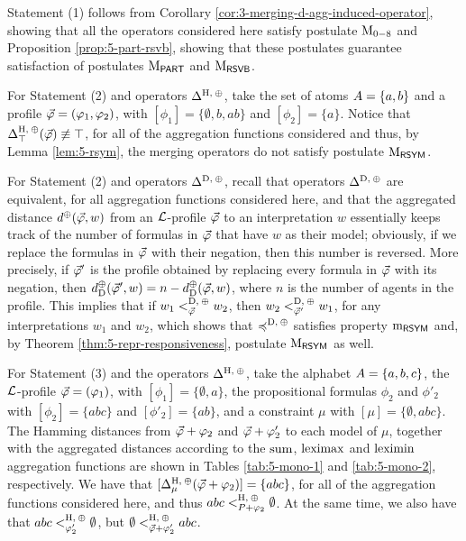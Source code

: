 \begin{prf*}{}{}%
	Statement (1) follows from Corollary \ref{cor:3-merging-d-agg-induced-operator},
	showing that all the operators considered here satisfy postulate $\ppm{0-8}$
	and Proposition \ref{prop:5-part-rsvb}, showing that these postulates guarantee 
	satisfaction of postulates $\ppm{\PART}$ and $\ppm{\RSVB}$.

	For Statement (2) and operators $\me^{\hamming,\:\agg}$,
	take the set of atoms $\Atoms=\{a,b\}$ and a profile $\P=(\phi_1,\phi_2)$,
	with $[\phi_{1}]=\{\emptyset,b,ab\}$ and $[\phi_{2}]=\{a\}$.
	Notice that $\me^{\hamming,\:\agg}_{\top}(\P)\not\equiv\top$,
	for all of the aggregation functions considered and thus,
	by Lemma \ref{lem:5-rsym}, the merging operators do not 
	satisfy postulate $\ppm{\RSYM}$.

	For Statement (2) and operators $\me^{\drastic,\:\agg}$,
	recall that operators $\me^{\drastic,\:\agg}$ are equivalent,
	for all aggregation functions considered here,
	and that the aggregated distance $\dd^{\agg}(\P,w)$ from an $\L$-profile $\P$
	to an interpretation $w$ essentially keeps track of the number of 
	formulas in $\P$ that have $w$ as their model;
	obviously, if we replace the formulas in $\P$ with their negation, then this number 
	is reversed. More precisely, if $\P'$ is the profile obtained by 
	replacing every formula in $\P$ with its negation, then 
	$\dd_{\drastic}^{\agg}(\P',w)=n-\dd_{\drastic}^{\agg}(\P,w)$, 
	where $n$ is the number of agents 
	in the profile. This implies that if $w_1<^{\drastic,\:\agg}_{\P}w_2$,
	then $w_2<^{\drastic,\:\agg}_{\P'}w_1$,
	for any interpretations $w_1$ and $w_2$,
	which shows that $\as^{\drastic,\:\agg}$ satisfies property $\oom{\RSYM}$
	and, by Theorem \ref{thm:5-repr-responsiveness},
	postulate $\ppm{\RSYM}$ as well.

	For Statement (3) and the operators $\me^{\hamming,\:\agg}$, 
	take the alphabet $\Atoms=\{a,b,c\}$,
	the $\L$-profile $\P=(\phi_1)$,
	with $[\phi_{1}]=\{\emptyset,a\}$, 
	the propositional formulas $\phi_{2}$ and $\phi'_{2}$
	with $[\phi_2]=\{abc\}$ and $[\phi'_2]=\{ab\}$,
	and a constraint $\mu$ with $[\mu]=\{\emptyset,abc\}$.
	The Hamming distances from $\P+\phi_2$ and $\P+\phi'_2$
	to each model of $\mu$, 
	together with the aggregated distances according to the 
	$\ssum$, $\leximax$ and $\leximin$ aggregation functions 
	are shown in Tables \ref{tab:5-mono-1} and \ref{tab:5-mono-2},
	respectively.
	We have that $[\me^{\hamming,\:\agg}_{\mu}(\P+\phi_2)]=\{abc\}$,
	for all of the aggregation functions considered here,
	and thus $abc<^{\hamming,\:\agg}_{P+\phi_2}\emptyset$.
	At the same time, we also have that 
	$abc<^{\hamming,\:\agg}_{\phi'_{2}}\emptyset$,
	but $\emptyset<^{\hamming,\:\agg}_{\P+\phi'_{2}}abc$.


\end{prf*}
